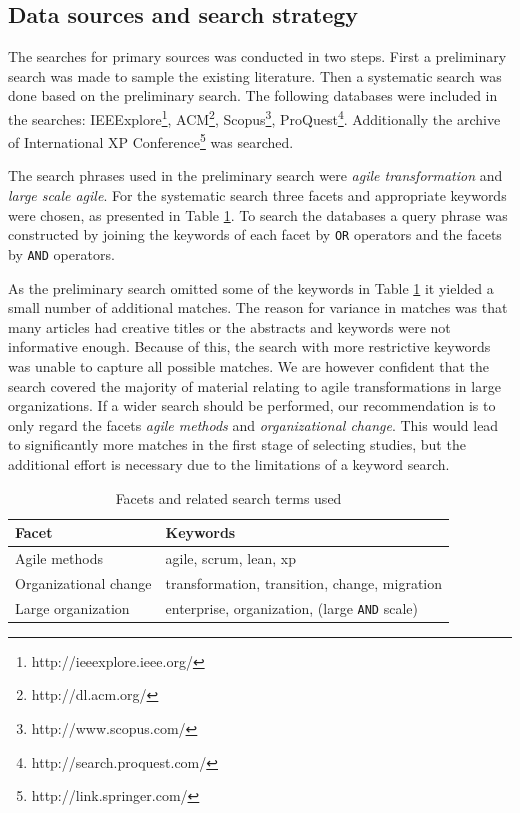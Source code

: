 \documentclass[lnbip]{svmultln}
\begin{document}
\subsection{Data sources and search strategy}

The searches for primary sources was conducted in two steps. First a preliminary
search was made to sample the existing literature. Then a systematic search was
done based on the preliminary search. The following databases were included in
the searches: IEEExplore\footnote{http://ieeexplore.ieee.org/},
ACM\footnote{http://dl.acm.org/}, Scopus\footnote{http://www.scopus.com/},
ProQuest\footnote{http://search.proquest.com/}.
Additionally the archive of International XP
Conference\footnote{http://link.springer.com/} was searched.

The search phrases used in the preliminary search were \textit{agile
transformation} and \textit{large scale agile}. For the systematic search three
facets and appropriate keywords were chosen, as presented in Table
\ref{table:searchterms}. To search the databases a query phrase was constructed
by joining the keywords of each facet by \texttt{OR} operators and the facets by
\texttt{AND} operators.

As the preliminary search omitted some of the keywords in Table
\ref{table:searchterms} it yielded a small number of additional matches. The
reason for variance in matches was that many articles had creative titles or the
abstracts and keywords were not informative enough. Because of this, the search
with more restrictive keywords was unable to capture all possible matches.
We are however confident that the search covered the majority of material
relating to agile transformations in large organizations. If a wider search
should be performed, our recommendation is to only regard the facets
\textit{agile methods} and \textit{organizational change}. This would lead to
significantly more matches in the first stage of selecting studies, but the
additional effort is necessary due to the limitations of a keyword search.

\begin{table}[h]
    \begin{tabular}{ l@{ \hskip 0.4cm } l }
        \toprule
        Facet                  & Keywords   \\ \midrule
        Agile methods          & agile, scrum, lean, xp \\ 
        Organizational change  & transformation, transition, change, migration \\
        Large organization     & enterprise, organization, (large \texttt{AND} scale) \\
        \bottomrule
    \end{tabular}
    \caption{Facets and related search terms used}
    \label{table:searchterms}
\end{table}
\end{document}
